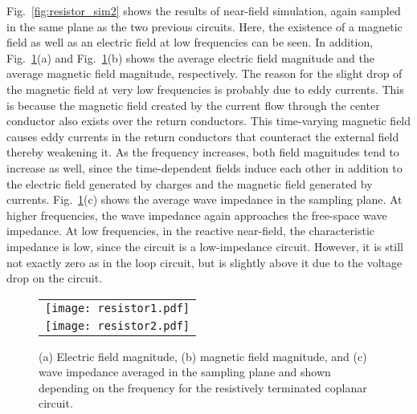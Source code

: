 Fig.~\ref{fig:resistor_sim2} shows the results of  near-field simulation, again sampled in the same plane as the two previous circuits. Here, the existence of a magnetic field as well as an electric field at low frequencies can be seen. In addition, Fig.~\ref{fig:resistor_sim3}(a) and Fig.~\ref{fig:resistor_sim3}(b) shows the average electric field magnitude and the average magnetic field magnitude, respectively. The reason for the slight drop of the magnetic field at very low frequencies is probably due to eddy currents. This is because the magnetic field created by the current flow through the center conductor also exists over the return conductors. This time-varying magnetic field causes eddy currents in the return conductors that counteract the external field thereby weakening it. As the frequency increases, both field magnitudes tend to increase as well, since the time-dependent fields induce each other in addition to the electric field generated by charges and the magnetic field generated by currents. Fig.~\ref{fig:resistor_sim3}(c) shows the average wave impedance in the sampling plane. At higher frequencies, the wave impedance again approaches the free-space wave impedance. At low frequencies, in the reactive near-field, the characteristic impedance is low, since the circuit is a low-impedance circuit. However, it is still not exactly zero as in the loop circuit, but is slightly above it due to the voltage drop on the circuit.
\begin{figure}
	\centering
	\begin{tabular}{c}
		\texttt{[image: resistor1.pdf]}\\
		\texttt{[image: resistor2.pdf]}
	\end{tabular}
	\caption{Near-field simulation results collected \SI{3}{\centi\meter} above the circuit in a $\SI{40}{\centi\meter} \times \SI{40}{\centi\meter}$ plane for the resistively terminated coplanar circuit.}
	\label{fig:resistor_sim2}
	\centering
	\hfill
	\par 
	\caption{(a) Electric field magnitude, (b) magnetic field magnitude, and (c) wave impedance averaged in the sampling plane and shown depending on the frequency for the resistively terminated coplanar circuit.}
	\label{fig:resistor_sim3}
\end{figure}
\FloatBarrier
